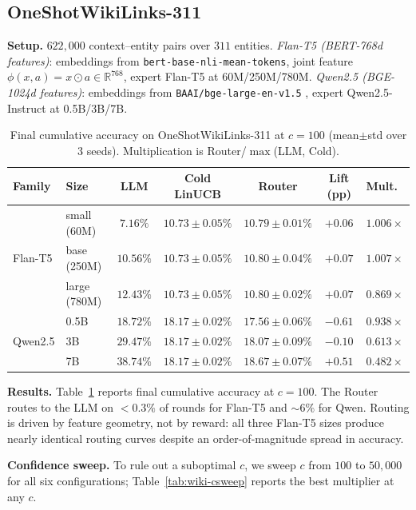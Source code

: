 \documentclass{article}
\theoremstyle{definition}
\theoremstyle{remark}
\theoremstyle{remark}
\begin{document}
\subsection{OneShotWikiLinks-311}
\label{sec:wiki}

\textbf{Setup.} $622{,}000$ context--entity pairs over $311$ entities.
\emph{Flan-T5 (BERT-768d features)}: embeddings from
\texttt{bert-base-nli-mean-tokens}, joint feature $\phi(x,a)=x\odot a\in\mathbb R^{768}$,
expert Flan-T5 \cite{chung2024scaling} at 60M/250M/780M.
\emph{Qwen2.5 (BGE-1024d features)}: embeddings from
\texttt{BAAI/bge-large-en-v1.5} \cite{xiao2024c}, expert Qwen2.5-Instruct
\cite{hui2024qwen2} at 0.5B/3B/7B.

\begin{table}[h]
\centering
\caption{Final cumulative accuracy on OneShotWikiLinks-311 at $c=100$
(mean$\pm$std over 3 seeds). Multiplication is Router/$\max$(LLM, Cold).}
\label{tab:wiki-results}
\small
\begin{tabular}{@{}llccccc@{}}
\toprule
Family & Size & LLM & Cold LinUCB & Router & Lift (pp) & Mult.\ \\
\midrule
\multirow{3}{*}{Flan-T5} & small (60M) & $7.16\%$  & $10.73\pm 0.05\%$ & $10.79\pm 0.01\%$ & $+0.06$ & $1.006\times$ \\
& base (250M)   & $10.56\%$ & $10.73\pm 0.05\%$ & $10.80\pm 0.04\%$ & $+0.07$ & $1.007\times$ \\
& large (780M)  & $12.43\%$ & $10.73\pm 0.05\%$ & $10.80\pm 0.02\%$ & $+0.07$ & $0.869\times$ \\
\midrule
\multirow{3}{*}{Qwen2.5} & 0.5B  & $18.72\%$ & $18.17\pm 0.02\%$ & $17.56\pm 0.06\%$ & $-0.61$ & $0.938\times$ \\
& 3B  & $29.47\%$ & $18.17\pm 0.02\%$ & $18.07\pm 0.09\%$ & $-0.10$ & $0.613\times$ \\
& 7B  & $38.74\%$ & $18.17\pm 0.02\%$ & $18.67\pm 0.07\%$ & $+0.51$ & $0.482\times$ \\
\bottomrule
\end{tabular}
\end{table}

\textbf{Results.} Table~\ref{tab:wiki-results} reports final cumulative
accuracy at $c=100$. The Router routes to the LLM on $<0.3\%$ of rounds for
Flan-T5 and $\sim6\%$ for Qwen. Routing is driven by feature geometry, not by
reward: all three Flan-T5 sizes produce nearly identical routing curves
despite an order-of-magnitude spread in accuracy.

\textbf{Confidence sweep.} To rule out a suboptimal $c$, we sweep $c$ from
$100$ to $50{,}000$ for all six configurations; Table~\ref{tab:wiki-csweep}
reports the best multiplier at any $c$.
\end{document}
